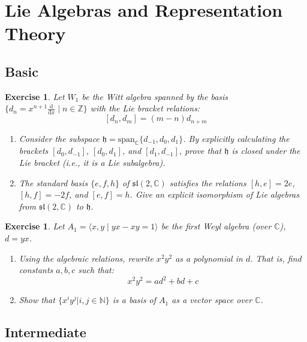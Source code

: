 \documentclass{article}
\newtheorem{exercise}[theorem]{Exercise}
\newcommand{\C}{\mathbb{C}}
\newcommand{\slC}{\mathfrak{sl}(2, \mathbb{C})}
\newcommand{\Z}{\mathbb{Z}}
\begin{document}
\section{Lie Algebras and Representation Theory}

\subsection*{Basic}

\begin{exercise}
Let $W_1$ be the Witt algebra spanned by the basis $\{ d_n=x^{n+1} \frac{\mathrm{d}}{\mathrm{d} x} \mid n \in \Z \}$ with the Lie bracket relations:
\[ [d_n, d_m] = (m-n)d_{n+m} \]
\begin{enumerate}
    \item Consider the subspace $\mathfrak{h} = \mathrm{span}_{\C}\{ d_{-1}, d_0, d_1 \}$. By explicitly calculating the brackets $[d_0, d_{-1}]$, $[d_0, d_1]$, and $[d_1, d_{-1}]$, prove that $\mathfrak{h}$ is closed under the Lie bracket (i.e., it is a Lie subalgebra).
    \item The standard basis $\{e, f, h\}$ of $\slC$ satisfies the relations $[h, e] = 2e$, $[h, f] = -2f$, and $[e, f] = h$. Give an explicit isomorphism of Lie algebras from $\slC$ to $\mathfrak{h}$.
\end{enumerate}
\end{exercise}

\begin{exercise}
Let $A_1 = \langle x, y \mid yx - xy = 1 \rangle$ be the first Weyl algebra (over $ \mathbb{C} $), $d = yx$.
\begin{enumerate}
    \item Using the algebraic relations, rewrite $x^2 y^2$ as a polynomial in $d$. That is, find constants $a, b, c$ such that:
    \[ x^2 y^2 = a d^2 + b d + c \]
    \item Show that $ \{ x^iy^j | i,j \in \mathbb{N}  \} $ is a basis of $A_1$ as a vector space over $\mathbb{C}$. 
\end{enumerate}
\end{exercise}

\subsection*{Intermediate}
\end{document}
